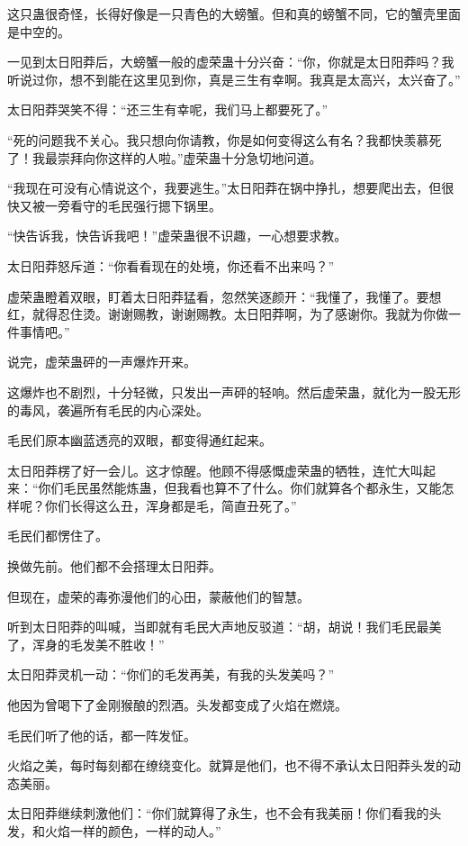 \begin{this_body}
这只蛊很奇怪，长得好像是一只青色的大螃蟹。但和真的螃蟹不同，它的蟹壳里面是中空的。

一见到太日阳莽后，大螃蟹一般的虚荣蛊十分兴奋：“你，你就是太日阳莽吗？我听说过你，想不到能在这里见到你，真是三生有幸啊。我真是太高兴，太兴奋了。”

太日阳莽哭笑不得：“还三生有幸呢，我们马上都要死了。”

“死的问题我不关心。我只想向你请教，你是如何变得这么有名？我都快羡慕死了！我最崇拜向你这样的人啦。”虚荣蛊十分急切地问道。

“我现在可没有心情说这个，我要逃生。”太日阳莽在锅中挣扎，想要爬出去，但很快又被一旁看守的毛民强行摁下锅里。

“快告诉我，快告诉我吧！”虚荣蛊很不识趣，一心想要求教。

太日阳莽怒斥道：“你看看现在的处境，你还看不出来吗？”

虚荣蛊瞪着双眼，盯着太日阳莽猛看，忽然笑逐颜开：“我懂了，我懂了。要想红，就得忍住烫。谢谢赐教，谢谢赐教。太日阳莽啊，为了感谢你。我就为你做一件事情吧。”

说完，虚荣蛊砰的一声爆炸开来。

这爆炸也不剧烈，十分轻微，只发出一声砰的轻响。然后虚荣蛊，就化为一股无形的毒风，袭遍所有毛民的内心深处。

毛民们原本幽蓝透亮的双眼，都变得通红起来。

太日阳莽楞了好一会儿。这才惊醒。他顾不得感慨虚荣蛊的牺牲，连忙大叫起来：“你们毛民虽然能炼蛊，但我看也算不了什么。你们就算各个都永生，又能怎样呢？你们长得这么丑，浑身都是毛，简直丑死了。”

毛民们都愣住了。

换做先前。他们都不会搭理太日阳莽。

但现在，虚荣的毒弥漫他们的心田，蒙蔽他们的智慧。

听到太日阳莽的叫喊，当即就有毛民大声地反驳道：“胡，胡说！我们毛民最美了，浑身的毛发美不胜收！”

太日阳莽灵机一动：“你们的毛发再美，有我的头发美吗？”

他因为曾喝下了金刚猴酿的烈酒。头发都变成了火焰在燃烧。

毛民们听了他的话，都一阵发怔。

火焰之美，每时每刻都在缭绕变化。就算是他们，也不得不承认太日阳莽头发的动态美丽。

太日阳莽继续刺激他们：“你们就算得了永生，也不会有我美丽！你们看我的头发，和火焰一样的颜色，一样的动人。”


\end{this_body}
